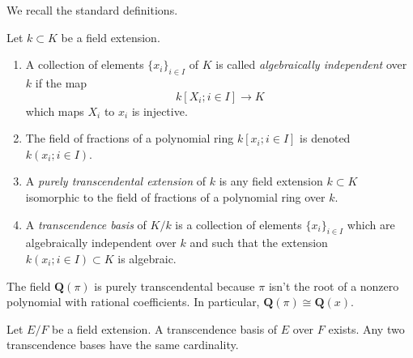 \noindent
We recall the standard definitions.

\begin{definition}
\label{definition-transcendence}
Let $k \subset K$ be a field extension.
\begin{enumerate}
\item A collection of elements $\{x_i\}_{i \in I}$ of $K$ is called
{\it algebraically independent} over $k$ if the map
$$
k[X_i; i\in I] \longrightarrow K
$$
which maps $X_i$ to $x_i$ is injective.
\item The field of fractions of a polynomial ring
$k[x_i; i \in I]$ is denoted $k(x_i; i\in I)$.
\item A {\it purely transcendental extension} of $k$ is any
field extension $k \subset K$ isomorphic to the field of
fractions of a polynomial ring over $k$.
\item A {\it transcendence basis} of $K/k$ is a
collection of elements $\{x_i\}_{i \in I}$ which are
algebraically independent over $k$ and such that
the extension $k(x_i; i\in I) \subset K$ is algebraic.
\end{enumerate}
\end{definition}

\begin{example}
\label{example-pi-transcendental}
The field $\mathbf{Q}(\pi)$ is purely transcendental because
$\pi$ isn't the root of a nonzero polynomial with rational coefficients.
In particular, $\mathbf{Q}(\pi) \cong \mathbf{Q}(x)$.
\end{example}

\begin{lemma}
\label{lemma-transcendence-degree}
Let $E/F$ be a field extension. A transcendence basis of $E$ over $F$ exists.
Any two transcendence bases have the same cardinality.
\end{lemma}

